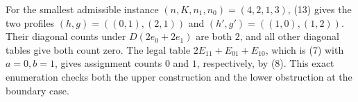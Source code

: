 For the smallest admissible instance \((n,K,n_1,n_0)=(4,2,1,3)\), (13) gives the two profiles \((h,g)=((0,1),(2,1))\) and \((h',g')=((1,0),(1,2))\). Their diagonal counts under \(D(2e_0+2e_1)\) are both \(2\), and all other diagonal tables give both count zero. The legal table \(2E_{11}+E_{01}+E_{10}\), which is (7) with \(a=0,b=1\), gives assignment counts \(0\) and \(1\), respectively, by (8). This exact enumeration checks both the upper construction and the lower obstruction at the boundary case.
